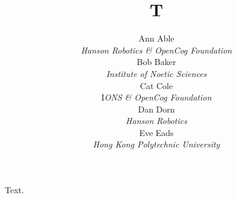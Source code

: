 \documentclass{article}
\title{T}
\author{
Ann Able \\
{\it Hanson Robotics \& OpenCog Foundation} \\
Bob Baker \\
{\it Institute of Noetic Sciences} \\
Cat Cole \\
I{\it ONS \& OpenCog Foundation} \\
Dan Dorn \\
{\it Hanson Robotics} \\
Eve Eads \\
{\it Hong Kong Polytechnic University}
}
\begin{document}
\maketitle
Text.
\end{document}

